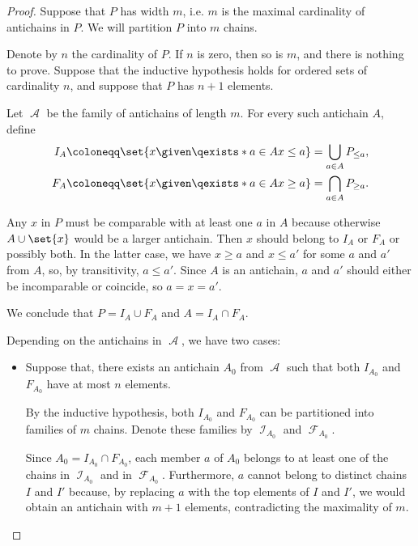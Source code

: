 \begin{proof}
  \SufficiencySubProof Suppose that \( P \) has width \( m \), i.e. \( m \) is the maximal cardinality of antichains in \( P \). We will partition \( P \) into \( m \) chains.

   Denote by \( n \) the cardinality of \( P \). If \( n \) is zero, then so is \( m \), and there is nothing to prove. Suppose that the inductive hypothesis holds for ordered sets of cardinality \( n \), and suppose that \( P \) has \( n + 1 \) elements.

  Let \( \mscrA \) be the family of antichains of length \( m \). For every such antichain \( A \), define
  \begin{align*}
    I_A &\coloneqq \set{ x \given \qexists* {a \in A} x \leq a } = \bigcup_{a \in A} P_{\leq a}, \\
    F_A &\coloneqq \set{ x \given \qexists* {a \in A} x \geq a } = \bigcap_{a \in A} P_{\geq a}.
  \end{align*}

  Any \( x \) in \( P \) must be comparable with at least one \( a \) in \( A \) because otherwise \( A \cup \set{ x } \) would be a larger antichain. Then \( x \) should belong to \( I_A \) or \( F_A \) or possibly both. In the latter case, we have \( x \geq a \) and \( x \leq a' \) for some \( a \) and \( a' \) from \( A \), so, by transitivity, \( a \leq a' \). Since \( A \) is an antichain, \( a \) and \( a' \) should either be incomparable or coincide, so \( a = x = a' \).

  We conclude that \( P = I_A \cup F_A \) and \( A = I_A \cap F_A \).

  Depending on the antichains in \( \mscrA \), we have two cases:
  \begin{itemize}
    \item Suppose that, there exists an antichain \( A_0 \) from \( \mscrA \) such that both \( I_{A_0} \) and \( F_{A_0} \) have at most \( n \) elements.

    By the inductive hypothesis, both \( I_{A_0} \) and \( F_{A_0} \) can be partitioned into families of \( m \) chains. Denote these families by \( \mscrI_{A_0} \) and \( \mscrF_{A_0} \).

    Since \( A_0 = I_{A_0} \cap F_{A_0} \), each member \( a \) of \( A_0 \) belongs to at least one of the chains in \( \mscrI_{A_0} \) and in \( \mscrF_{A_0} \). Furthermore, \( a \) cannot belong to distinct chains \( I \) and \( I' \) because, by replacing \( a \) with the top elements of \( I \) and \( I' \), we would obtain an antichain with \( m + 1 \) elements, contradicting the maximality of \( m \).


\end{itemize}
\end{proof}
